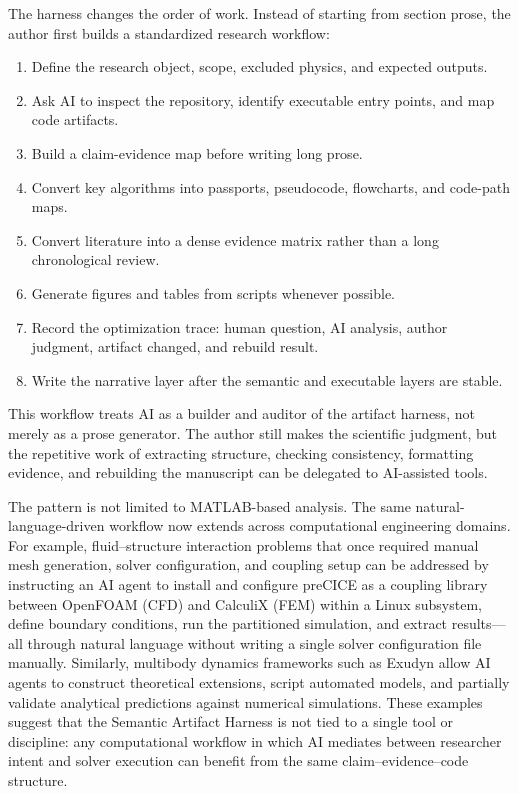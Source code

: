 \documentclass{article}
\begin{document}
The harness changes the order of work. Instead of starting from section prose, the author first builds a standardized research workflow:

\begin{enumerate}
    \item Define the research object, scope, excluded physics, and expected outputs.
    \item Ask AI to inspect the repository, identify executable entry points, and map code artifacts.
    \item Build a claim-evidence map before writing long prose.
    \item Convert key algorithms into passports, pseudocode, flowcharts, and code-path maps.
    \item Convert literature into a dense evidence matrix rather than a long chronological review.
    \item Generate figures and tables from scripts whenever possible.
    \item Record the optimization trace: human question, AI analysis, author judgment, artifact changed, and rebuild result.
    \item Write the narrative layer after the semantic and executable layers are stable.
\end{enumerate}

This workflow treats AI as a builder and auditor of the artifact harness, not merely as a prose generator. The author still makes the scientific judgment, but the repetitive work of extracting structure, checking consistency, formatting evidence, and rebuilding the manuscript can be delegated to AI-assisted tools.

The pattern is not limited to MATLAB-based analysis. The same natural-language-driven workflow now extends across computational engineering domains. For example, fluid--structure interaction problems that once required manual mesh generation, solver configuration, and coupling setup can be addressed by instructing an AI agent to install and configure preCICE \citep{chourdakis2022preCICE} as a coupling library between OpenFOAM (CFD) \citep{openfoam} and CalculiX (FEM) \citep{dhondt2024calculix} within a Linux subsystem, define boundary conditions, run the partitioned simulation, and extract results---all through natural language without writing a single solver configuration file manually. Similarly, multibody dynamics frameworks such as Exudyn \citep{holzinger2024exudyn} allow AI agents to construct theoretical extensions, script automated models, and partially validate analytical predictions against numerical simulations. These examples suggest that the Semantic Artifact Harness is not tied to a single tool or discipline: any computational workflow in which AI mediates between researcher intent and solver execution can benefit from the same claim--evidence--code structure.
\end{document}
